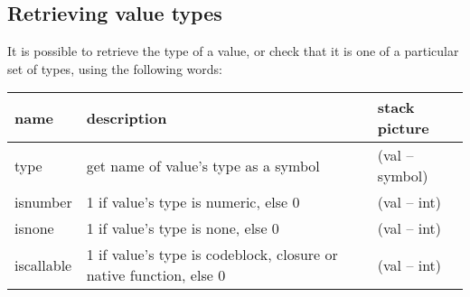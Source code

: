 \subsection{Retrieving value types}
\label{typechecking}
It is possible to retrieve the type of a value, or check that it is
one of a particular set of types, using the following words:
\begin{center}
\begin{tabular}{|l|p{4in}|l|}\hline
\textbf{name} & \textbf{description} & \textbf{stack picture}\\ \hline
type & get name of value's type as a symbol & (val -- symbol)\\
isnumber & 1 if value's type is numeric, else 0 & (val -- int)\\
isnone & 1 if value's type is none, else 0 & (val -- int)\\
iscallable & 1 if value's type is codeblock, closure or native function, else 0 & (val -- int)\\
\hline
\end{tabular}
\end{center}

\clearpage
